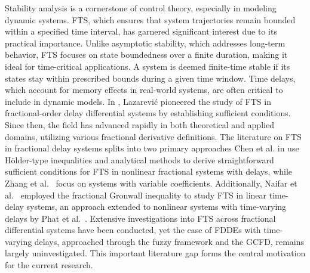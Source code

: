 \documentclass[10pt,a4paper]{amsart}
\numberwithin{equation}{section}
\begin{document}
Stability analysis is a cornerstone of control theory, especially in modeling dynamic
systems. FTS, which ensures that system trajectories remain bounded within a specified
time interval, has garnered significant interest due to its practical importance.
Unlike asymptotic stability, which addresses long-term behavior, FTS focuses on state
boundedness over a finite duration, making it ideal for time-critical applications.
A system is deemed finite-time stable if its states stay within prescribed bounds
during a given time window. Time delays, which account for memory effects in
real-world systems, are often critical to include in dynamic models.
In \cite{laz2006}, Lazarević pioneered the study of FTS in fractional-order delay
differential systems by establishing sufficient conditions. Since then,
the field has advanced rapidly in both theoretical and applied domains, utilizing
various fractional derivative definitions. The literature on FTS in fractional delay
systems splits into two primary approaches Chen et al. in \cite{che} use H\"older-type
inequalities and analytical methods to derive straightforward sufficient conditions
for FTS in nonlinear fractional systems with delays, while Zhang et al.\ \cite{zhan}
focus on systems with variable coefficients. Additionally, Naifar et al.\
\cite{naif} employed the fractional Gronwall inequality to study FTS in linear
time-delay systems, an approach extended to nonlinear systems with time-varying delays
by Phat et al.\ \cite{phat}. Extensive investigations into FTS across fractional
differential systems have been conducted, yet the case of FDDEs
 with time-varying delays, approached through the fuzzy framework and the GCFD,
remains largely uninvestigated. This important literature gap forms the central
motivation for the current research.
\end{document}
